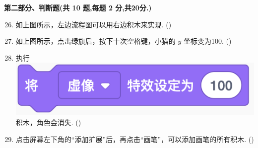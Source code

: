 \documentclass[10pt, a4paper]{article}
\begin{document}
    {\noindent\textbf{第二部分、判断题(共 10 题,每题 2 分,共20分.)}}
    \begin{enumerate}
        \setcounter{enumi}{25}
        \item 如上图所示，左边流程图可以用右边积木来实现. (\qquad)

        \item 如上图所示，点击绿旗后，按下十次空格键，小猫的 $y$ 坐标变为100. (\qquad)

        \item 执行\includegraphics[width=.2\textwidth]{28.png}积木，角色会消失. (\qquad)

        \newpage
        \item 点击屏幕左下角的“添加扩展”后，再点击“画笔”，可以添加画笔的所有积木. (\qquad)


\end{enumerate}
\end{document}

